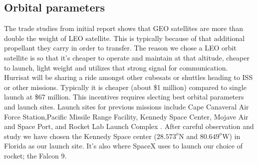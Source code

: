 \subsection{Orbital parameters}
The trade studies from initial report shows that GEO satellites are more than double the weight of LEO satellite.  This is typically because of that additional propellant they carry in order to transfer. The reason we chose a LEO orbit satellite is so that it's cheaper to operate and maintain at that altitude, cheaper to launch, light weight and utilizes that strong signal for communication. Hurrisat will be sharing a ride amongst other cubesats or shuttles heading to ISS or other missions. Typically it is cheaper (about \$1 million) compared to single launch at \$67 million. This incentives requires slecting best orbital parameters and launch sites. Launch sites for previous missions include Cape Canaveral Air Force Station,Pacific Missile Range Facility, Kennedy Space Center, Mojave Air and Space Port, and Rocket Lab Launch Complex \cite{NASA2022}. After careful observation and study \cite{Cipera2018} we have chosen the Kennedy Space center ($28.573^o$N and $80.649^o$W) in Florida as our launch site. It's also where SpaceX uses to launch our choice of rocket; the Falcon 9.


